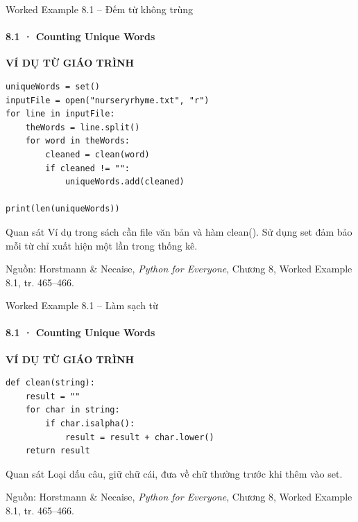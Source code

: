 \documentclass[aspectratio=169,10pt]{beamer}
\begin{document}
\begin{frame}[fragile,t]{Worked Example 8.1 – Đếm từ không trùng}
\framesubtitle{8.1 · Counting Unique Words}
{\small\color{teal}\textbf{VÍ DỤ TỪ GIÁO TRÌNH}}\par\medskip
\begin{Verbatim}[fontsize=\footnotesize,frame=single,framesep=3mm,rulecolor=\color{teal!35},breaklines=true]
uniqueWords = set()
inputFile = open("nurseryrhyme.txt", "r")
for line in inputFile:
    theWords = line.split()
    for word in theWords:
        cleaned = clean(word)
        if cleaned != "":
            uniqueWords.add(cleaned)

print(len(uniqueWords))
\end{Verbatim}
\begin{block}{Quan sát}
Ví dụ trong sách cần file văn bản và hàm clean(). Sử dụng set đảm bảo mỗi từ chỉ xuất hiện một lần trong thống kê.
\end{block}
\vfill
{\scriptsize\color{muted}Nguồn: Horstmann \& Necaise, \textit{Python for Everyone}, Chương 8, Worked Example 8.1, tr. 465–466.}
\end{frame}

\begin{frame}[fragile,t]{Worked Example 8.1 – Làm sạch từ}
\framesubtitle{8.1 · Counting Unique Words}
{\small\color{teal}\textbf{VÍ DỤ TỪ GIÁO TRÌNH}}\par\medskip
\begin{Verbatim}[fontsize=\footnotesize,frame=single,framesep=3mm,rulecolor=\color{teal!35},breaklines=true]
def clean(string):
    result = ""
    for char in string:
        if char.isalpha():
            result = result + char.lower()
    return result
\end{Verbatim}
\begin{block}{Quan sát}
Loại dấu câu, giữ chữ cái, đưa về chữ thường trước khi thêm vào set.
\end{block}
\vfill
{\scriptsize\color{muted}Nguồn: Horstmann \& Necaise, \textit{Python for Everyone}, Chương 8, Worked Example 8.1, tr. 465–466.}
\end{frame}
\end{document}
